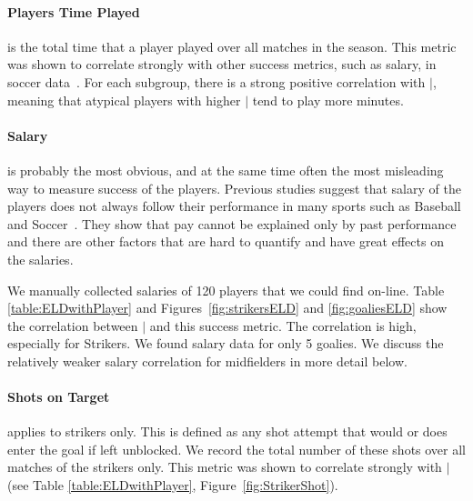 {	\paragraph{Players Time Played} is the total time that a player played over all matches in the season. This metric was shown to correlate strongly with other success metrics, such as salary, in soccer data~\cite{schwartz}. 
%	
%	
	For each subgroup, there is a strong positive correlation with $\mid$, meaning that atypical players with higher $\mid$ tend to play more minutes.
	
	\paragraph{Salary} is probably the most obvious, and at the same time often the most misleading way to measure success of the players. Previous studies suggest that salary of the players does not  always follow their performance in many sports such as Baseball and Soccer~\cite{Hall2002,Barrio2004}. They show that pay cannot be explained only by past performance and there are other factors that are hard to quantify and have great effects on the salaries. 
	
	 We manually collected salaries of 120 players that we could find on-line. Table \ref{table:ELDwithPlayer}  and Figures~\ref{fig:strikersELD} and \ref{fig:goaliesELD} show the correlation between $\mid$ and this success metric. The correlation is high, especially for Strikers. We found salary data for only 5 goalies. We discuss the relatively weaker salary correlation for midfielders in more detail below.
	 
	 \paragraph{Shots on Target} applies to strikers only. This is defined as any shot attempt that would or does enter the goal if left unblocked. We record the total number of these shots over all matches of the strikers only. This metric was shown to correlate strongly with $\mid$ (see Table \ref{table:ELDwithPlayer}, Figure~\ref{fig:StrikerShot}).
	 
}
